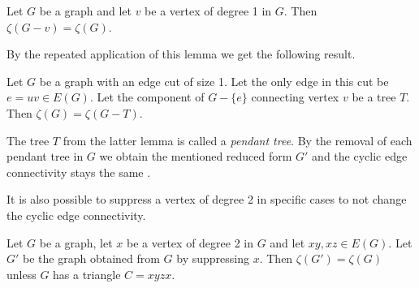 \documentclass[12pt, twoside]{book}
\begin{document}
\begin{lemma}
	Let $G$ be a graph and let $v$ be a vertex of degree 1 in $G$. Then $\zeta(G-v)=\zeta(G)$.
\end{lemma}

By the repeated application of this lemma we get the following result.

\begin{lemma}
	Let $G$ be a graph with an edge cut of size 1. Let the only edge in this cut be $e=uv\in E(G)$. Let the component of $G-\{e\}$ connecting vertex $v$ be a tree $T$. Then $\zeta(G)=\zeta(G-T)$.
\end{lemma}

The tree $T$ from the latter lemma is called a \textit{pendant tree}. By the removal of each pendant tree in $G$ we obtain the mentioned reduced form $G'$ and the cyclic edge connectivity stays the same \cite{Lou2008}.

It is also possible to suppress a vertex of degree 2 in specific cases to not change the cyclic edge connectivity.

\begin{lemma}
	Let $G$ be a graph, let $x$ be a vertex of degree 2 in $G$ and let $xy, xz\in E(G)$. Let $G'$ be the graph obtained from $G$ by suppressing $x$. Then $\zeta(G')=\zeta(G)$ unless $G$ has a triangle $C=xyzx$. 
\end{lemma}
\end{document}
